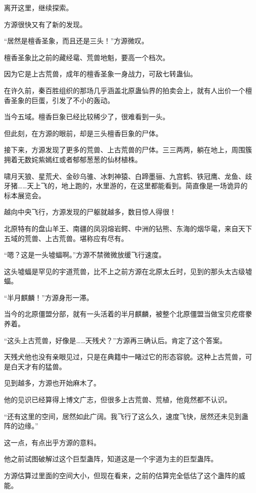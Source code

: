 \begin{this_body}
离开这里，继续探索。

方源很快又有了新的发现。

“居然是檀香圣象，而且还是三头！”方源微叹。

檀香圣象比之前的藏经鼋、荒兽地魁，要高一个档次。

因为它是上古荒兽，成年的檀香圣象一身战力，可敌七转蛊仙。

在许久前，秦百胜组织的那场几乎涵盖北原蛊仙界的拍卖会上，就有人出价一个檀香圣象的巨蛋，引发了不小的轰动。

当今五域。檀香巨象已经比较稀少了，很难看到一头。

但此刻，在方源的眼前，却是三头檀香巨象的尸体。

接下来，方源发现了更多的荒兽、上古荒兽的尸体。三三两两，躺在地上，周围簇拥着无数姹紫嫣红或者郁郁葱葱的仙材植株。

啸月天狼、星荒犬、金砂乌骓、冰刺神猿、白蹄墨骊、九宫鹤、铁冠鹰、龙鱼、歧牙猪……天上飞的，地上跑的，水里游的，在这里都能看到。简直像是一场诡异的标本展览会。

越向中央飞行，方源发现的尸躯就越多，数目惊人得很！

北原特有的盘山羊王、南疆的凤羽熔岩鳄、中洲的钻熊、东海的烟华鼋，来自天下五域的荒兽、上古荒兽。堪称应有尽有。

“嗯？这是一头墟蝠啊。”方源不禁微微放缓飞行速度。

这头墟蝠是罕见的宇道荒兽，比不上之前方源在北原太丘时，见到的那头太古级墟蝠。

“半月麒麟！”方源身形一滞。

当今的北原僵盟分部，就有一头活着的半月麒麟，被整个北原僵盟当做宝贝疙瘩豢养着。

“这头上古荒兽，好像是……天残犬？”方源再三确认后。肯定了这个答案。

天残犬他也没有亲眼见过，只是在典籍中一睹过它的形态容貌。这种上古荒兽，可是白天才有的猛兽。

见到越多，方源也开始麻木了。

他的见识已经算得上博文广志，但很多上古荒兽、荒植，他竟然都不认识。

“还有这里的空间，居然如此广阔。我飞行了这么久，速度飞快，居然还未见到蛊阵的边缘。”

这一点，有点出乎方源的意料。

他之前试图破解过这个巨型蛊阵，知道这是一个宇道为主的巨型蛊阵。

方源估算过里面的空间大小，但现在看来，之前的估算完全低估了这个蛊阵的威能。


\end{this_body}
